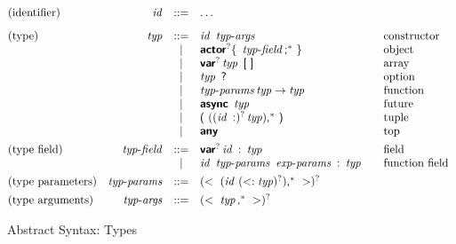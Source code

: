 
\begin{figure*}

$$
\begin{array}{@{}lrcl@{\qquad}l}
\text{(identifier)} & \x{id} &::=&
  \dots \\
[2ex]
\text{(type)} & \x{typ} &::=&
  \x{id}~\x{typ-args}
    & \text{constructor} \\&&|&
  \KK{actor}^? \K\{~\x{typ-field}\K;^\ast~\K\}
    & \text{object} \\&&|&
  \KK{var}^? \x{typ}~\K[~\K]
    & \text{array} \\&&|&
  \x{typ}~\K?
    & \text{option} \\&&|&
  \x{typ-params} \x{typ} \Kto \x{typ}
    & \text{function} \\&&|&
  \KK{async}~\x{typ}
    & \text{future} \\&&|&
  \K(~( (\x{id}~\K:)^? \x{typ})\K,^\ast~\K)
    & \text{tuple} \\&&|&
  \KK{any}
    & \text{top} \\
[1ex]
\text{(type field)} & \x{typ-field} &::=&
  \KK{var}^? \x{id}~\K:~\x{typ}
    & \text{field} \\&&|&
  \x{id}~\x{typ-params}~\x{exp-params}~\K:~\x{typ}
    & \text{function field} \\
[1ex]
\text{(type parameters)} & \x{typ-params} &::=&
  (\Klt~(\x{id}~(\Ksub \x{typ})^?)\K,^\ast~\Kgt)^? \\
[1ex]
\text{(type arguments)} & \x{typ-args} &::=&
  (\Klt~\x{typ}\K,^\ast~\Kgt)^? \\
\end{array}
$$

\caption{Abstract Syntax: Types}
\label{fig:syntax.typ}

\end{figure*}


